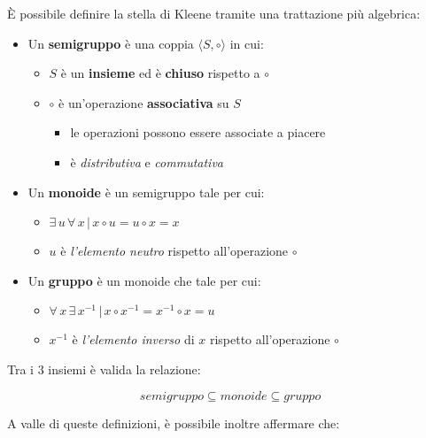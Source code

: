 \documentclass[italian, 10pt]{article}
\begin{document}
È possibile definire la stella di Kleene tramite una trattazione più algebrica:

\begin{itemize}
  \item Un \textbf{semigruppo} è una coppia \(\langle S, \circ \rangle\) in cui:
        \begin{itemize}
          \item \(S\) è un \textbf{insieme} ed è \textbf{chiuso} rispetto a \(\circ\)
          \item \(\circ\) è un'operazione \textbf{associativa} su \(S\)
                \begin{itemize}[label=\(\rightarrow\)]
                  \item le operazioni possono essere associate a piacere
                  \item è \textit{distributiva} e \textit{commutativa}
                \end{itemize}
        \end{itemize}
  \item Un \textbf{monoide} è un semigruppo tale per cui:
        \begin{itemize}
          \item \( \exists \, u \, \forall \, x \, | \, x \circ u = u \circ x = x \)
          \item \(u\) è \textit{l'elemento neutro} rispetto all'operazione \(\circ\)
        \end{itemize}
  \item Un \textbf{gruppo} è un monoide che tale per cui:
        \begin{itemize}
          \item \( \forall \, x \, \exists \, x^{-1} \, | \, x \circ x^{-1} = x^{-1} \circ x = u\)
          \item \(x^{-1}\) è \textit{l'elemento inverso} di \(x\) rispetto all'operazione \(\circ\)
        \end{itemize}
\end{itemize}

Tra i \(3\) insiemi è valida la relazione:

\[ semigruppo \subseteq monoide \subseteq gruppo \]

\bigskip
A valle di queste definizioni, è possibile inoltre affermare che:
\end{document}
